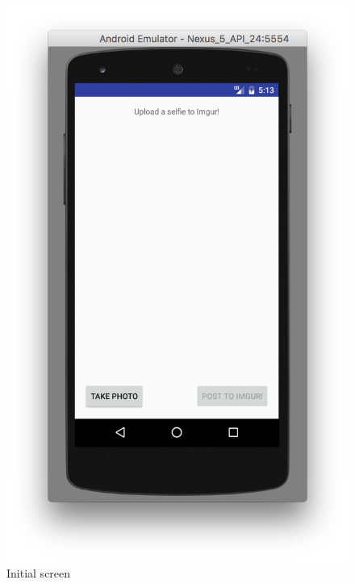 \documentclass[12pt]{article}
\begin{document}
\begin{figure}[H]
    \includegraphics[scale=0.5]{./step1.png}
    \caption{Initial screen}
\end{figure}
\end{document}
